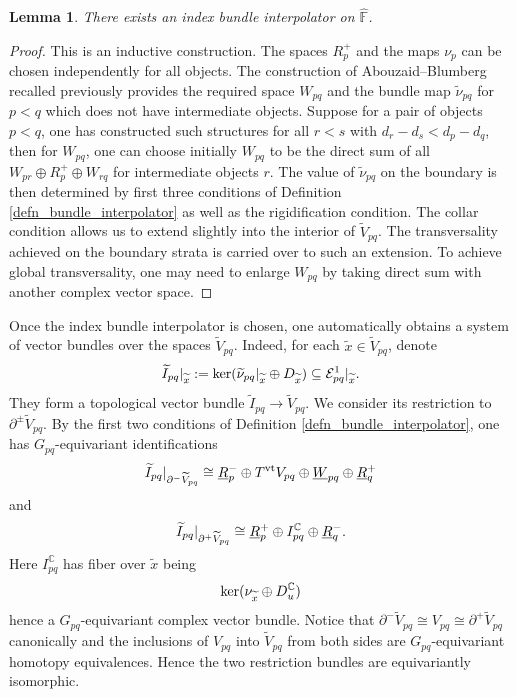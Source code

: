 \documentclass[reqno, 10pt]{amsart}
\numberwithin{equation}{section}
\numberwithin{equation}{section}
\renewcommand{\subset}{\subseteq}
\newtheorem{lemma}[thm]{Lemma}
\theoremstyle{definition}
\theoremstyle{remark}
\newcommand{\beqn}{\begin{equation*}}
\newcommand{\eeqn}{\end{equation*}}
\newcommand{\mb}{\mathbb}
\newcommand{\mc}{\mathcal}
\newcommand{\wt}{\widetilde}
\newcommand{\uds}[1]{\underline{\smash{#1}}}
\begin{document}
\begin{lemma}
There exists an index bundle interpolator on $\hat{\mb F}$.
\end{lemma}

\begin{proof}
This is an inductive construction. The spaces $R_p^+$ and the maps $\nu_p$ can be chosen independently for all objects. The construction of Abouzaid--Blumberg recalled previously provides the required space $W_{pq}$ and the bundle map $\wt\nu_{pq}$ for $p<q$ which does not have intermediate objects. Suppose for a pair of objects $p< q$, one has constructed such structures for all $r<s$ with $d_r -d_s < d_p - d_q$, then for $W_{pq}$, one can choose initially $W_{pq}$ to be the direct sum of all $W_{pr} \oplus R_p^+ \oplus W_{rq}$ for intermediate objects $r$. The value of $\wt\nu_{pq}$ on the boundary is then determined by first three conditions of Definition \ref{defn_bundle_interpolator} as well as the rigidification condition. The collar condition allows us to extend slightly into the interior of $\wt V_{pq}$. The transversality achieved on the boundary strata is carried over to such an extension. To achieve global transversality, one may need to enlarge $W_{pq}$ by taking direct sum with another complex vector space.  
\end{proof}

Once the index bundle interpolator is chosen, one automatically obtains a system of vector bundles over the spaces $\wt V_{pq}$. Indeed, for each $\wt x\in \wt V_{pq}$, denote
\beqn
\wt I_{pq}|_{\wt x}:= {\rm ker} ( \wt \nu_{pq}|_{\wt x} \oplus D_{\wt x}) \subset {\mc E}_{pq}^1|_{\wt x}.
\eeqn
They form a topological vector bundle $\wt I_{pq} \to \wt V_{pq}$. We consider its restriction to $\partial^\pm \wt V_{pq}$. By the first two conditions of Definition \ref{defn_bundle_interpolator}, one has $G_{pq}$-equivariant identifications
\beqn
\wt I_{pq}|_{\partial^- \wt V_{pq}} \cong \uds R_p^- \oplus T^{\rm vt} V_{pq} \oplus \uds W_{pq} \oplus \uds R_q^+
\eeqn
and 
\beqn
\wt I_{pq}|_{\partial^+ \wt V_{pq}} \cong \uds R_p^+ \oplus I_{pq}^{\mb C} \oplus \uds R_q^-.
\eeqn
Here $I_{pq}^{\mb C}$ has fiber over $\wt x$ being
\beqn
{\rm ker} ( \nu_{\wt x} \oplus D_u^{\mb C})
\eeqn
hence a $G_{pq}$-equivariant complex vector bundle. Notice that $\partial^- \wt V_{pq} \cong V_{pq} \cong \partial^+ \wt V_{pq}$ canonically and the inclusions of $V_{pq}$ into $\wt V_{pq}$ from both sides are $G_{pq}$-equivariant homotopy equivalences. Hence the two restriction bundles are equivariantly isomorphic.
\end{document}

